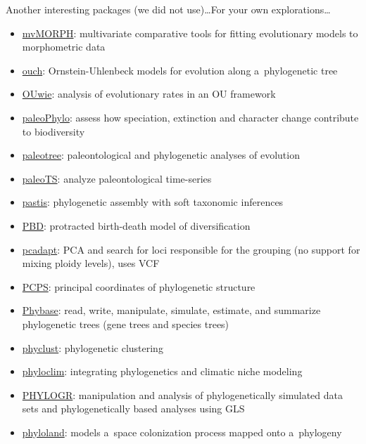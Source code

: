 \documentclass[compress, ucs, xelatex, 11pt, xcolor=svgnames,
  hyperref={
    bookmarks=true,
    unicode=true,
    colorlinks=true,
    pdftitle={Molecular data in R},
    plainpages=false,
    pdfauthor={Vojtech Zeisek},
    pdfsubject={Course about phylogeny and evolution in R},
    pdfcreator={XeLaTeX},
    pdfkeywords={R, evolution, phylogeny, molecular data},
    linkcolor=Tomato,
    anchorcolor=SaddleBrown,
    citecolor=Goldenrod,
    filecolor=DarkMagenta,
    menucolor=Sienna,
    urlcolor=DarkTurquoise,
    pdftex},
  url={hyphens, lowtilde} %
  ]{beamer}
\begin{document}
\begin{frame}[allowframebreaks]{Another interesting packages (we did not use)\ldots}{For your own explorations\ldots}
\begin{itemize}
    \item \href{https://CRAN.R-project.org/package=mvMORPH}{mvMORPH}: multivariate comparative tools for fitting evolutionary models to morphometric data
    \item \href{https://CRAN.R-project.org/package=ouch}{ouch}: Ornstein-Uhlenbeck models for evolution along a~phylogenetic tree
    \item \href{https://CRAN.R-project.org/package=OUwie}{OUwie}: analysis of evolutionary rates in an OU framework
    \item \href{https://r-forge.r-project.org/projects/paleophylo/}{paleoPhylo}: assess how speciation, extinction and character change contribute to biodiversity
    \item \href{https://CRAN.R-project.org/package=paleotree}{paleotree}: paleontological and phylogenetic analyses of evolution
    \item \href{https://CRAN.R-project.org/package=paleoTS}{paleoTS}: analyze paleontological time-series
    \item \href{https://CRAN.R-project.org/package=pastis}{pastis}: phylogenetic assembly with soft taxonomic inferences
    \item \href{https://CRAN.R-project.org/package=PBD}{PBD}: protracted birth-death model of diversification
    \item \href{https://CRAN.R-project.org/package=pcadapt}{pcadapt}: PCA and search for loci responsible for the grouping (no support for mixing ploidy levels), uses VCF
    \item \href{https://CRAN.R-project.org/package=PCPS}{PCPS}: principal coordinates of phylogenetic structure
    \item \href{https://faculty.franklin.uga.edu/lliu/content/phybase}{Phybase}: read, write, manipulate, simulate, estimate, and summarize phylogenetic trees (gene trees and species trees)
    \item \href{https://CRAN.R-project.org/package=phyclust}{phyclust}: phylogenetic clustering
    \item \href{https://CRAN.R-project.org/package=phyloclim}{phyloclim}: integrating phylogenetics and climatic niche modeling
    \item \href{https://CRAN.R-project.org/package=PHYLOGR}{PHYLOGR}: manipulation and analysis of phylogenetically simulated data sets and phylogenetically based analyses using GLS
    \item \href{https://CRAN.R-project.org/package=phyloland}{phyloland}: models a~space colonization process mapped onto a~phylogeny

\end{itemize}
\end{frame}
\end{document}
